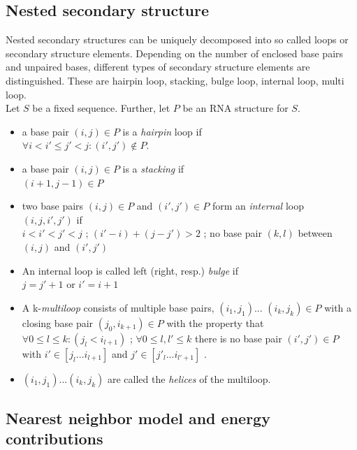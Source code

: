 \documentclass[twoside,a4paper]{report}
\numberwithin{equation}{section}
\begin{document}
	\subsection{Nested secondary structure}
	Nested secondary structures can be uniquely decomposed into so called loops or secondary structure elements. Depending on the number of enclosed base pairs  and unpaired bases, different types of secondary structure elements are distinguished. These are hairpin loop, stacking, bulge loop, internal loop, multi loop. \\
	Let $S$ be a fixed sequence. Further, let $P$ be an RNA structure for $S$.
	\begin{itemize}
		\item a base pair $( i, j ) \in P$ is a \textit{hairpin} loop if\\
			$	\forall i < i' \leq j' < j : (i', j') \notin P. $

		\item a base pair $( i, j ) \in P$ is a \textit{stacking} if\\
		$(i + 1 , j - 1 ) \in P $
		\item two base pairs $ (i, j) \in P$ and $(i' ,j' ) \in P$ form  an \textit{internal} loop $(i,j,i',j')$ if \\
		$i < i' < j' < j $ ; $ (i' - i)+( j - j') > 2$ ; no base pair $(k,l)$ between $(i, j)$ and $(i',j')$
		\item An internal loop is called left (right, resp.) \textit{bulge} if\\
		$ j = j' +1 $ or $ i' = i+1$
		\item A k-\textit{multiloop} consists of multiple base pairs, $(i_1,j_1)$... $(i_k,j_k) \in P$ with a closing base pair $(j_0, i_{k+1}) \in P$ with the property that \\
		$\forall 0 \leq l \leq k : ( j_l < i_{l+1})$ ; $\forall 0 \leq l , l' \leq k$  there is no base pair $(i' ,j') \in P$ with $i' \in [j_l...i_{l+1}]$ and $j' \in [j'_l...i_{l'+1}]$ .
		\item $(i_1,j_1)...(i_k, j_k)$ are called the \textit{helices} of the multiloop.\\
 	\end{itemize}
 

 	 
 	 \subsection{Nearest neighbor model and energy contributions }
 	 
\end{document}
